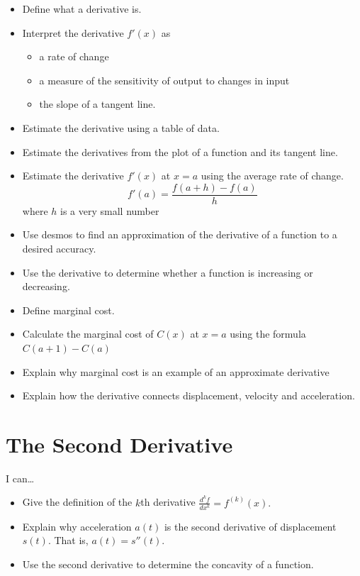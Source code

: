 \documentclass[
]{book}
\providecommand{\tightlist}{%
  \setlength{\itemsep}{0pt}\setlength{\parskip}{0pt}}
\begin{document}
\begin{itemize}
\tightlist
\item
  Define what a derivative is.
\item
  Interpret the derivative \(f'(x)\) as

  \begin{itemize}
  \tightlist
  \item
    a rate of change
  \item
    a measure of the sensitivity of output to changes in input
  \item
    the slope of a tangent line.
  \end{itemize}
\item
  Estimate the derivative using a table of data.
\item
  Estimate the derivatives from the plot of a function and its tangent line.
\item
  Estimate the derivative \(f'(x)\) at \(x=a\) using the average rate of change.
  \[
  f'(a) = \frac{f(a+h)-f(a)}{h}
  \]
  where \(h\) is a very small number
\item
  Use desmos to find an approximation of the derivative of a function to a desired accuracy.
\item
  Use the derivative to determine whether a function is increasing or decreasing.
\item
  Define marginal cost.
\item
  Calculate the marginal cost of \(C(x)\) at \(x=a\) using the formula \(C(a+1)-C(a)\)
\item
  Explain why marginal cost is an example of an approximate derivative
\item
  Explain how the derivative connects displacement, velocity and acceleration.
\end{itemize}

\hypertarget{the-second-derivative-1}{%
\section{The Second Derivative}\label{the-second-derivative-1}}

I can\ldots{}

\begin{itemize}
\tightlist
\item
  Give the definition of the \(k\)th derivative
  \(\displaystyle{\frac{d^kf}{dx^k} = f^{(k)}(x)}.\)
\item
  Explain why acceleration \(a(t)\) is the second derivative of displacement \(s(t)\). That is, \(a(t) = s''(t).\)
\item
  Use the second derivative to determine the concavity of a function.
\end{itemize}
\end{document}
